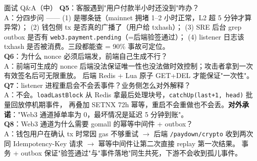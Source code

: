 \documentclass[aspectratio=169,11pt]{beamer}
\begin{document}
\begin{frame}[shrink]{面试 Q\&A（中）}
\textbf{Q5}：客服遇到"用户付款半小时还没到"咋办？\\
\hspace{4mm}\small A：分四步问 ——
(1) 是哪条链（mainnet 拥堵 1--2 小时正常，L2 超 5 分钟才算异常）；
(2) 钱包侧 tx 是否真的广播了（用户给 txhash）；
(3) SRE 后台 grep outbox 是否有 \texttt{web3.payment.pending}（=后端验签通过）；
(4) listener 日志该 txhash 是否被消费。三段都能查 = 90\% 事故可定位。\\

\vspace{1.5mm}
\textbf{Q6}：为什么 nonce 必须后端发，前端自己生成不行？\\
\hspace{4mm}\small A：前端可生成的 nonce 后端没法保证唯一性也没法做时效控制；攻击者拿到一次有效签名后可无限重放。
后端 Redis + Lua 原子 GET+DEL 才能保证"一次性"。\\

\vspace{1.5mm}
\textbf{Q7}：listener 进程重启会不会丢事件？业务侧怎么对外解释？\\
\hspace{4mm}\small A：不会。\texttt{loadLastBlock} 从 Redis 拿最后处理块号，\texttt{catchUp(last+1, head)} 批量回放停机期事件，
再叠加 SETNX 72h 幂等，重启不会重做也不会丢。\textbf{对外承诺}："Web3 通道掉单率为 0，最坏情况是延迟 5 分钟到账"。\\

\vspace{1.5mm}
\textbf{Q8}：Web3 通道为什么需要 gomall 的幂等中间件 + outbox？\\
\hspace{4mm}\small A：钱包用户在确认 tx 时常因 gas 不够重试 $\to$ 后端 \texttt{/paydown/crypto} 收到两次同 Idempotency-Key 请求 $\to$ 幂等中间件让第二次直接 replay 第一次结果。
事务 + outbox 保证"验签通过"与"事件落地"同生共死，下游不会收到孤儿事件。\\
\end{frame}
\end{document}
